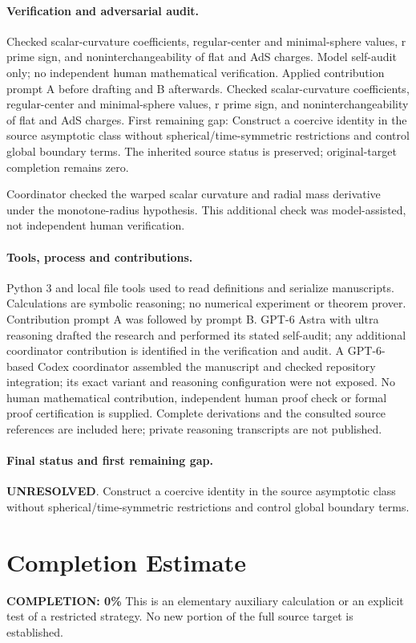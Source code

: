 \documentclass[11pt]{article}
\begin{document}
\paragraph{Verification and adversarial audit.}
Checked scalar-curvature coefficients, regular-center and minimal-sphere values, r prime sign, and noninterchangeability of flat and AdS charges. Model self-audit only; no independent human mathematical verification. Applied contribution prompt A before drafting and B afterwards. Checked scalar-curvature coefficients, regular-center and minimal-sphere values, r prime sign, and noninterchangeability of flat and AdS charges. First remaining gap: Construct a coercive identity in the source asymptotic class without spherical/time-symmetric restrictions and control global boundary terms. The inherited source status is preserved; original-target completion remains zero.

Coordinator checked the warped scalar curvature and radial mass derivative under the monotone-radius hypothesis. This additional check was model-assisted, not independent human verification.

\paragraph{Tools, process and contributions.}
Python 3 and local file tools used to read definitions and serialize manuscripts. Calculations are symbolic reasoning; no numerical experiment or theorem prover. Contribution prompt A was followed by prompt B. GPT-6 Astra with ultra reasoning drafted the research and performed its stated self-audit; any additional coordinator contribution is identified in the verification and audit. A GPT-6-based Codex coordinator assembled the manuscript and checked repository integration; its exact variant and reasoning configuration were not exposed. No human mathematical contribution, independent human proof check or formal proof certification is supplied. Complete derivations and the consulted source references are included here; private reasoning transcripts are not published.

\paragraph{Final status and first remaining gap.}
\textbf{UNRESOLVED}. Construct a coercive identity in the source asymptotic class without spherical/time-symmetric restrictions and control global boundary terms.

\section{Completion Estimate}
\noindent\textbf{COMPLETION: 0\%}
This is an elementary auxiliary calculation or an explicit test of a restricted strategy. No new portion of the full source target is established.
\end{document}
